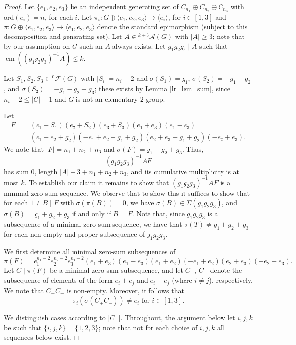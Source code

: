 \documentclass{amsart}
\theoremstyle{definition}
\numberwithin{equation}{section}
\begin{document}
\begin{proof}
Let $\{e_1,e_2,e_3\}$ be an independent generating set of $C_{n_1}\oplus C_{n_2}\oplus C_{n_3}$ with ${\mathrm{ord}}(e_i)=n_i$ for each $i$.
Let $\pi_i: G \oplus \langle e_1,e_2,e_3\rangle \to \langle e_i\rangle$, for $i \in [1,3]$ and $\pi: G \oplus \langle e_1,e_2,e_3\rangle \to \langle e_1,e_2,e_3\rangle$ denote the standard epimorphism (subject to this decomposition and generating set).
Let $A\in {{}^{{k+3}}\!\mathcal{A}}(G)$ with $|A|\ge 3$; note that by our assumption on
$G$ such an $A$ always exists.
Let $g_1g_2g_3\mid A$ such that
$\operatorname{cm}((g_1g_2g_3)^{-1}A)\le k$.

Let $S_1,S_2,S_3 \in {{}^{{0}}\!\mathcal{F}}(G)$ with $|S_i|=n_i-2$ and
$\sigma(S_1) = g_1$, $\sigma(S_2)= -g_1-g_2$, and
$\sigma(S_3) = -g_1 - g_2 + g_3$;
these exists by Lemma \ref{lr_lem_sum}, since $n_i-2\le |G|-1$ and $G$ is not an
elementary $2$-group.

Let
\[ \begin{split}F=& (e_1+S_1)(e_2+S_2)(e_3+S_3)(e_1+e_3)(e_1-e_3)\\ & (e_1+e_2+g_2)(-e_1+e_2+g_1+g_2)(e_2+e_3+g_1+g_2)(-e_2+e_3).
\end{split}
\]
We note that $|F|=n_1+n_2+n_3$ and $\sigma(F)=g_1+g_2+g_3$.
Thus,
\[(g_1g_2g_3)^{-1}AF\]
has sum $0$, length $|A|-3 + n_1 + n_2 + n_3$, and its cumulative multiplicity is at most $k$.
To establish our claim it remains to show that $(g_1g_2g_3)^{-1}AF$
is a minimal zero-sum sequence.
We observe that to show this it suffices to show that
for each $1\neq B \mid F$ with $\sigma(\pi(B))=0$, we have
$\sigma(B)\in \Sigma(g_1g_2g_3)$, and $\sigma(B)=g_1+g_2+g_3$ if and only if
$B=F$. Note that, since $g_1g_2g_3$ is a subsequence of a minimal zero-sum sequence, we have that $\sigma(T)\neq g_1+g_2+g_3$ for each non-empty and proper subsequence of $g_1g_2g_3$.

We first determine all minimal zero-sum subsequences of
\[\pi(F) =
e_1^{n_1-2} e_2^{n_2-2} e_3^{n_3-2}(e_1+e_3)
(e_1-e_3)(e_1+e_2)(-e_1+e_2)(e_2+e_3)(-e_2+e_3).\]
Let $C\mid \pi(F)$ be a minimal zero-sum subsequence, and let
 $C_+$, $C_-$ denote the subsequence of elements of the form $e_i+e_j$ and $e_i-e_j$ (where $i \neq j$), respectively.
We note that $C_+C_-$ is non-empty. Moreover, it follows that
\begin{equation}
\label{eq_cn4}
\pi_i(\sigma(C_+C_-))\neq e_i \text{ for } i\in [1,3].
\end{equation}

We distinguish cases according to $|C_-|$. Throughout, the argument
below let $i,j,k$ be such that $\{i,j,k\}=\{1,2,3\}$; note that
not for each choice of $i,j,k$ all sequences below exist.


\end{proof}
\end{document}
